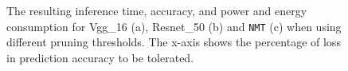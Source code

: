 \begin{figure}[!t]
\centering
{}
\hfill
{}
\hfill
{}
\hfill
\caption{The resulting inference time, accuracy, and power and energy consumption
for Vgg\_16 (a), Resnet\_50 (b) and \texttt{NMT} (c) when using different pruning thresholds.
The x-axis shows the percentage of loss in prediction accuracy to be tolerated. }
\label{fig:threshold}
\end{figure}

